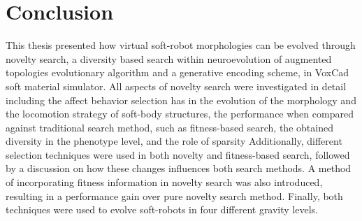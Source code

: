 
\chapter{Conclusion} %

\label{Conclusion} %


This thesis presented how virtual soft-robot morphologies can be evolved through novelty search, a diversity based search within neuroevolution of augmented topologies evolutionary algorithm and a generative encoding scheme, in VoxCad soft material simulator. All aspects of novelty search were investigated in detail including the affect behavior selection has in the evolution of the morphology and the locomotion strategy of soft-body structures, the performance when compared against traditional search method, such as fitness-based search, the obtained diversity in the phenotype level, and the role of sparsity  Additionally, different selection techniques were used in both novelty and fitness-based search, followed by a discussion on how these changes influences both search methods. A method of incorporating fitness information in novelty search was also introduced, resulting in a performance gain over pure novelty search method. Finally, both techniques were used to evolve soft-robots in four different gravity levels.


\\

\\

\\
